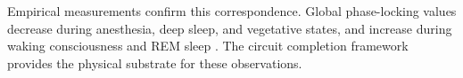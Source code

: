 Empirical measurements confirm this correspondence. Global phase-locking values decrease during anesthesia, deep sleep, and vegetative states, and increase during waking consciousness and REM sleep \citep{mashour2020recovery,casali2013theoretically}. The circuit completion framework provides the physical substrate for these observations.


